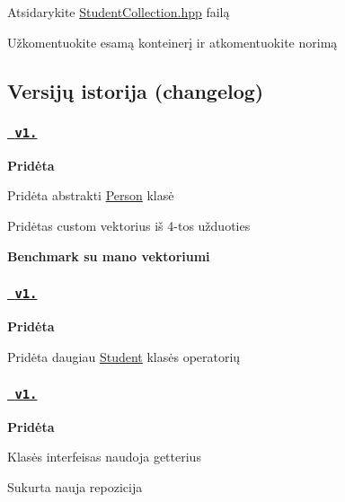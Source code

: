 \begin{DoxyItemize}
\item Atsidarykite \mbox{\hyperlink{_student_collection_8hpp_source}{Student\+Collection.\+hpp}} failą
\item Užkomentuokite esamą konteinerį ir atkomentuokite norimą
\end{DoxyItemize}

\subsection*{Versijų istorija (changelog)}

\subsubsection*{\href{https://github.com/emilisb/OOP-3/releases/tag/v1.5}{\texttt{ v1.}}}

{\bfseries{Pridėta}}


\begin{DoxyItemize}
\item Pridėta abstrakti {\ttfamily \mbox{\hyperlink{class_person}{Person}}} klasė
\item Pridėtas custom vektorius iš 4-\/tos užduoties
\end{DoxyItemize}

{\bfseries{Benchmark su mano vektoriumi}} 

\subsubsection*{\href{https://github.com/emilisb/OOP-3/releases/tag/v1.2}{\texttt{ v1.}}}

{\bfseries{Pridėta}}


\begin{DoxyItemize}
\item Pridėta daugiau {\ttfamily \mbox{\hyperlink{class_student}{Student}}} klasės operatorių
\end{DoxyItemize}

\subsubsection*{\href{https://github.com/emilisb/OOP-3/releases/tag/v1.1}{\texttt{ v1.}}}

{\bfseries{Pridėta}}


\begin{DoxyItemize}
\item Klasės interfeisas naudoja getter\textquotesingle{}ius
\item Sukurta nauja repozicija
\end{DoxyItemize}

